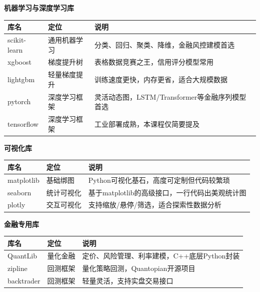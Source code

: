 \textbf{机器学习与深度学习库}

\begin{table}[H]
\centering
\small
\begin{tabular}{llp{6cm}}
\toprule
\textbf{库名} & \textbf{定位} & \textbf{说明} \\
\midrule
scikit-learn & 通用机器学习 & 分类、回归、聚类、降维，金融风控建模首选 \\
xgboost & 梯度提升树 & 表格数据竞赛之王，信用评分模型常用 \\
lightgbm & 轻量梯度提升 & 训练速度更快，内存更省，适合大规模数据 \\
pytorch & 深度学习框架 & 灵活动态图，LSTM/Transformer等金融序列模型首选 \\
tensorflow & 深度学习框架 & 工业部署成熟，本课程仅简要提及 \\
\bottomrule
\end{tabular}
\end{table}

\textbf{可视化库}

\begin{table}[H]
\centering
\small
\begin{tabular}{llp{6cm}}
\toprule
\textbf{库名} & \textbf{定位} & \textbf{说明} \\
\midrule
matplotlib & 基础绑图 & Python可视化基石，高度可定制但代码较繁琐 \\
seaborn & 统计可视化 & 基于matplotlib的高级接口，一行代码出美观统计图 \\
plotly & 交互可视化 & 支持缩放/悬停/筛选，适合探索性数据分析 \\
\bottomrule
\end{tabular}
\end{table}

\textbf{金融专用库}

\begin{table}[H]
\centering
\small
\begin{tabular}{llp{6cm}}
\toprule
\textbf{库名} & \textbf{定位} & \textbf{说明} \\
\midrule
QuantLib & 量化金融 & 定价、风险管理、利率建模，C++底层Python封装 \\
zipline & 回测框架 & 量化策略回测，Quantopian开源项目 \\
backtrader & 回测框架 & 轻量灵活，支持实盘交易接口 \\
\bottomrule
\end{tabular}
\end{table}

